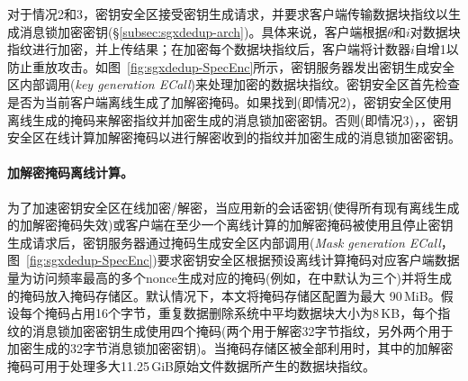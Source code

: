 对于情况2和3，密钥安全区接受密钥生成请求，并要求客户端传输数据块指纹以生成消息锁加密密钥(\S\ref{subsec:sgxdedup-arch})。具体来说，客户端根据$\theta$和$i$对数据块指纹进行加密，并上​​传结果；在加密每个数据块指纹后，客户端将计数器$i$自增1以防止重放攻击。如图~\ref{fig:sgxdedup-SpecEnc}所示，密钥服务器发出密钥生成安全区内部调用(\textit{key generation ECall})来处理加密的数据块指纹。密钥安全区首先检查是否为当前客户端离线生成了加解密掩码。如果找到(即情况2)，密钥安全区使用离线生成的掩码来解密指纹并加密生成的消息锁加密密钥。否则(即情况3)，，密钥安全区在线计算加解密掩码以进行解密收到的指纹并加密生成的消息锁加密密钥。

\paragraph*{加解密掩码离线计算。}为了加速密钥安全区在线加密/解密，当应用新的会话密钥(使得所有现有离线生成的加解密掩码失效)或客户端在至少一个离线计算的加解密掩码被使用且停止密钥生成请求后，密钥服务器通过掩码生成安全区内部调用(\textit{Mask generation ECall}，图~\ref{fig:sgxdedup-SpecEnc})要求密钥安全区根据预设离线计算掩码对应客户端数据量为访问频率最高的多个nonce生成对应的掩码(例如，在\sysnameS 中默认为三个)并将生成的掩码放入掩码存储区。默认情况下，本文将掩码存储区配置为最大 90\,MiB。假设每个掩码占用16个字节，重复数据删除系统中平均数据块大小为8\,KB，每个指纹的消息锁加密密钥生成使用四个掩码(两个用于解密32字节指纹，另外两个用于加密生成的32字节消息锁加密密钥)。当掩码存储区被全部利用时，其中的加解密掩码可用于处理多大11.25\,GiB原始文件数据所产生的数据块指纹。
